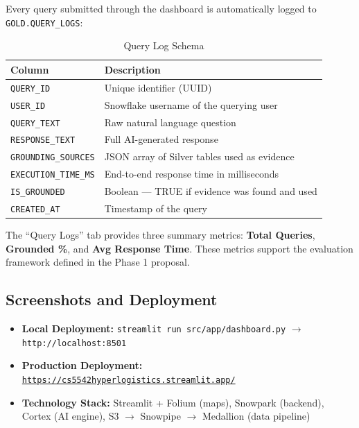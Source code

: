 \documentclass[14.5pt,letterpaper]{article}
\begin{document}
Every query submitted through the dashboard is automatically logged to \texttt{GOLD.QUERY\_LOGS}:

\begin{table}[H]
\centering
\caption{Query Log Schema}
\begin{tabular}{@{}ll@{}}
\toprule
\textbf{Column} & \textbf{Description} \\
\midrule
\texttt{QUERY\_ID}          & Unique identifier (UUID) \\
\texttt{USER\_ID}           & Snowflake username of the querying user \\
\texttt{QUERY\_TEXT}        & Raw natural language question \\
\texttt{RESPONSE\_TEXT}     & Full AI-generated response \\
\texttt{GROUNDING\_SOURCES} & JSON array of Silver tables used as evidence \\
\texttt{EXECUTION\_TIME\_MS} & End-to-end response time in milliseconds \\
\texttt{IS\_GROUNDED}       & Boolean --- TRUE if evidence was found and used \\
\texttt{CREATED\_AT}        & Timestamp of the query \\
\bottomrule
\end{tabular}
\end{table}

The ``Query Logs'' tab provides three summary metrics: \textbf{Total Queries}, \textbf{Grounded \%}, and \textbf{Avg Response Time}. These metrics support the evaluation framework defined in the Phase 1 proposal.

\subsection{Screenshots and Deployment}

\begin{itemize}
    \item \textbf{Local Deployment:} \texttt{streamlit run src/app/dashboard.py} $\rightarrow$ \texttt{http://localhost:8501}
    \item \textbf{Production Deployment:} \href{https://cs5542hyperlogistics.streamlit.app/}{\texttt{https://cs5542hyperlogistics.streamlit.app/}}
    \item \textbf{Technology Stack:} Streamlit + Folium (maps), Snowpark (backend), Cortex (AI engine), S3 $\rightarrow$ Snowpipe $\rightarrow$ Medallion (data pipeline)
\end{itemize}
\end{document}
